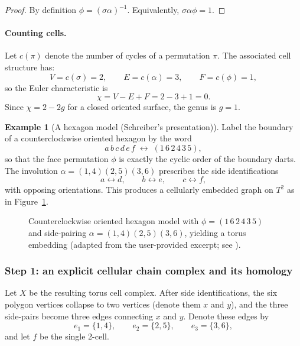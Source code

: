 \documentclass[11pt,oneside]{amsbook}
\numberwithin{equation}{section}
\theoremstyle{plain}
\theoremstyle{definition}
\newtheorem{example}[theorem]{Example}
\theoremstyle{remark}
\begin{document}
\begin{proof}
By definition $\phi=(\sigma\alpha)^{-1}$.
Equivalently, $\sigma\alpha\phi=1$.
\end{proof}

\paragraph{Counting cells.}
Let $c(\pi)$ denote the number of cycles of a permutation $\pi$.
The associated cell structure has:
\[
V=c(\sigma)=2,\qquad E=c(\alpha)=3,\qquad F=c(\phi)=1,
\]
so the Euler characteristic is
\[
\chi = V-E+F = 2-3+1=0.
\]
Since $\chi=2-2g$ for a closed oriented surface, the genus is $g=1$.

\begin{example}[A hexagon model (Schreiber's presentation)]
Label the boundary of a counterclockwise oriented hexagon by the word
\[
a\,b\,c\,d\,e\,f \;\longleftrightarrow\; (1\,6\,2\,4\,3\,5),
\]
so that the face permutation $\phi$ is exactly the cyclic order of the boundary darts.
The involution $\alpha=(1,4)(2,5)(3,6)$ prescribes the side identifications
\[
a\leftrightarrow d,\qquad b\leftrightarrow e,\qquad c\leftrightarrow f,
\]
with opposing orientations.
This produces a cellularly embedded graph on $T^2$ as in Figure~\ref{fig:schreiber_torus_hexagon}.
\end{example}

\begin{figure}[t]
\centering
\caption{Counterclockwise oriented hexagon model with $\phi=(1\,6\,2\,4\,3\,5)$ and side-pairing $\alpha=(1,4)(2,5)(3,6)$, yielding a torus embedding (adapted from the user-provided excerpt; see \cite{Schreiber2018SurfaceAlgebrasI}).}
\label{fig:schreiber_torus_hexagon}
\end{figure}

\subsubsection{Step 1: an explicit cellular chain complex and its homology}

Let $X$ be the resulting torus cell complex.
After side identifications, the six polygon vertices collapse to two vertices (denote them $x$ and $y$), and the three side-pairs become three edges connecting $x$ and $y$.
Denote these edges by
\[
e_1=\{1,4\},\qquad e_2=\{2,5\},\qquad e_3=\{3,6\},
\]
and let $f$ be the single 2-cell.
\end{document}
